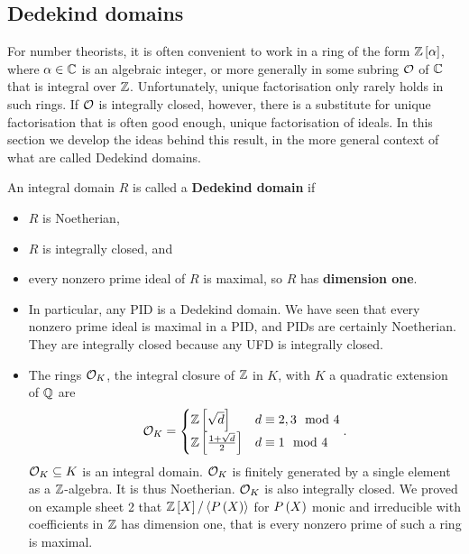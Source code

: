 
\subsection{Dedekind domains}

For number theorists, it is often convenient to work in a ring of the form $ \mathbb{Z}\left[ \alpha \right] $, where $ \alpha \in \mathbb{C} $ is an algebraic integer, or more generally in some subring $ \mathcal{O} $ of $ \mathbb{C} $ that is integral over $ \mathbb{Z} $. Unfortunately, unique factorisation only rarely holds in such rings. If $ \mathcal{O} $ is integrally closed, however, there is a substitute for unique factorisation that is often good enough, unique factorisation of ideals. In this section we develop the ideas behind this result, in the more general context of what are called Dedekind domains.

\begin{definition}
An integral domain $ R $ is called a \textbf{Dedekind domain} if
\begin{itemize}
\item $ R $ is Noetherian,
\item $ R $ is integrally closed, and
\item every nonzero prime ideal of $ R $ is maximal, so $ R $ has \textbf{dimension one}.
\end{itemize}
\end{definition}

\begin{example*}
\hfill
\begin{itemize}
\item In particular, any PID is a Dedekind domain. We have seen that every nonzero prime ideal is maximal in a PID, and PIDs are certainly Noetherian. They are integrally closed because any UFD is integrally closed.
\item The rings $ \mathcal{O}_K $, the integral closure of $ \mathbb{Z} $ in $ K $, with $ K $ a quadratic extension of $ \mathbb{Q} $ are
$$ \mathcal{O}_K =
\begin{cases}
\mathbb{Z}\left[ \sqrt{d} \right] & d \equiv 2, 3 \mod 4 \\
\mathbb{Z}\left[ \tfrac{1 + \sqrt{d}}{2} \right] & d \equiv 1 \mod 4
\end{cases}.
$$
$ \mathcal{O}_K \subseteq K $ is an integral domain. $ \mathcal{O}_K $ is finitely generated by a single element as a $ \mathbb{Z} $-algebra. It is thus Noetherian. $ \mathcal{O}_K $ is also integrally closed. We proved on example sheet 2 that $ \mathbb{Z}\left[ X \right] / \left\langle P\left( X \right) \right\rangle $ for $ P\left( X \right) $ monic and irreducible with coefficients in $ \mathbb{Z} $ has dimension one, that is every nonzero prime of such a ring is maximal.
\end{itemize}
\end{example*}

